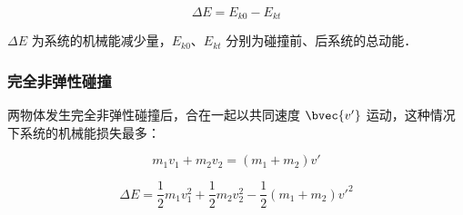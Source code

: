 \begin{equation}
\Delta E = E_{k0}-E_{kt}
\end{equation}

$\Delta E$ 为系统的机械能减少量，$E_{k0}$、$ E_{kt}$ 分别为碰撞前、后系统的总动能．

\subsubsection{完全非弹性碰撞}

两物体发生完全非弹性碰撞后，合在一起以共同速度 $\bvec {v'}$ 运动，这种情况下系统的机械能损失最多：

\begin{equation}
m_1v_1+m_2v_2=(m_1+m_2)v'
\end{equation}

\begin{equation}
\Delta E=\frac12m_1v_1^2+\frac12m_2v_2^2-\frac12(m_1+m_2)v'^2
\end{equation}

